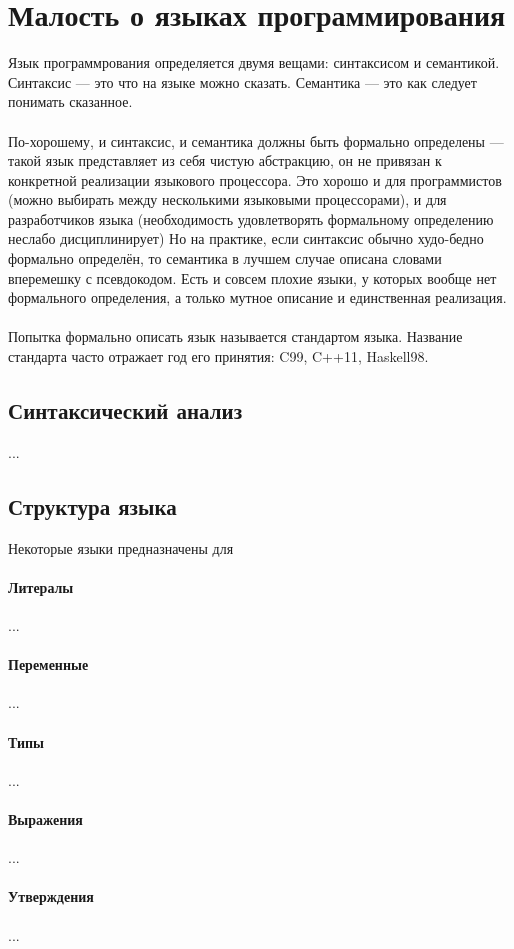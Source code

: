 \documentclass[11pt]{book}
\begin{document}
\chapter{Малость о языках программирования}
Язык программрования определяется двумя вещами: синтаксисом и семантикой.
Синтаксис --- это что на языке можно сказать.
Семантика --- это как следует понимать сказанное.
\\ \\
По-хорошему, и синтаксис, и семантика должны быть формально определены ---
такой язык представляет из себя чистую абстракцию, он не привязан к конкретной реализации языкового процессора.
Это хорошо и для программистов (можно выбирать между несколькими языковыми процессорами),
и для разработчиков языка (необходимость удовлетворять формальному определению неслабо дисциплинирует)
Но на практике, если синтаксис обычно худо-бедно формально определён, то семантика в лучшем случае описана словами вперемешку с псевдокодом.
Есть и совсем плохие языки, у которых вообще нет формального определения, а только мутное описание и единственная реализация.
\\ \\
Попытка формально описать язык называется стандартом языка.
Название стандарта часто отражает год его принятия: C99, C++11, Haskell98.

\section{Синтаксический анализ}
...
\section{Структура языка}
Некоторые языки предназначены для 
\subsubsection{Литералы}
...
\subsubsection{Переменные}
...
\subsubsection{Типы}
...
\subsubsection{Выражения}
...
\subsubsection{Утверждения}
...
\end{document}
